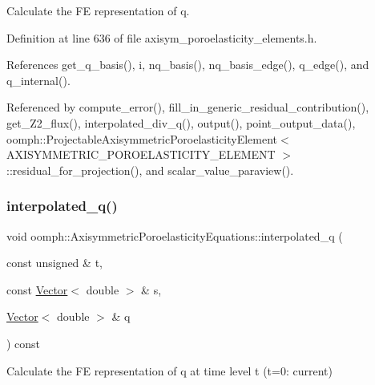 Calculate the FE representation of q. 



Definition at line 636 of file axisym\+\_\+poroelasticity\+\_\+elements.\+h.



References get\+\_\+q\+\_\+basis(), i, nq\+\_\+basis(), nq\+\_\+basis\+\_\+edge(), q\+\_\+edge(), and q\+\_\+internal().



Referenced by compute\+\_\+error(), fill\+\_\+in\+\_\+generic\+\_\+residual\+\_\+contribution(), get\+\_\+\+Z2\+\_\+flux(), interpolated\+\_\+div\+\_\+q(), output(), point\+\_\+output\+\_\+data(), oomph\+::\+Projectable\+Axisymmetric\+Poroelasticity\+Element$<$ A\+X\+I\+S\+Y\+M\+M\+E\+T\+R\+I\+C\+\_\+\+P\+O\+R\+O\+E\+L\+A\+S\+T\+I\+C\+I\+T\+Y\+\_\+\+E\+L\+E\+M\+E\+N\+T $>$\+::residual\+\_\+for\+\_\+projection(), and scalar\+\_\+value\+\_\+paraview().

\mbox{\label{classoomph_1_1AxisymmetricPoroelasticityEquations_a81044677b94131e3bb8f38462ca4467a}} 
\subsubsection{\texorpdfstring{interpolated\+\_\+q()}{interpolated\_q()}\hspace{0.1cm}{\footnotesize\ttfamily [2/4]}}
{\footnotesize\ttfamily void oomph\+::\+Axisymmetric\+Poroelasticity\+Equations\+::interpolated\+\_\+q (\begin{DoxyParamCaption}\item[{const unsigned \&}]{t,  }\item[{const \hyperlink{classoomph_1_1Vector}{Vector}$<$ double $>$ \&}]{s,  }\item[{\hyperlink{classoomph_1_1Vector}{Vector}$<$ double $>$ \&}]{q }\end{DoxyParamCaption}) const\hspace{0.3cm}{\ttfamily [inline]}}



Calculate the FE representation of q at time level t (t=0\+: current) 



